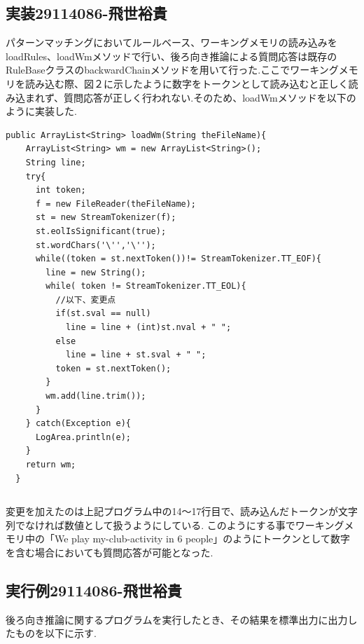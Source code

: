 \documentclass{jarticle}
\begin{document}
\subsection{実装29114086-飛世裕貴}
パターンマッチングにおいてルールベース、ワーキングメモリの読み込みをloadRules、loadWmメソッドで行い、後ろ向き推論による質問応答は既存のRuleBaseクラスのbackwardChainメソッドを用いて行った.ここでワーキングメモリを読み込む際、図２に示したように数字をトークンとして読み込むと正しく読み込まれず、質問応答が正しく行われない.そのため、loadWmメソッドを以下のように実装した.\\

\begin{lstlisting}[caption=loadWmメソッド]
  public ArrayList<String> loadWm(String theFileName){
    ArrayList<String> wm = new ArrayList<String>();
    String line;
    try{
      int token;
      f = new FileReader(theFileName);
      st = new StreamTokenizer(f);
      st.eolIsSignificant(true);
      st.wordChars('\'','\'');
      while((token = st.nextToken())!= StreamTokenizer.TT_EOF){
        line = new String();
        while( token != StreamTokenizer.TT_EOL){
          //以下、変更点
          if(st.sval == null)
            line = line + (int)st.nval + " ";
          else
            line = line + st.sval + " ";
          token = st.nextToken();
        }
        wm.add(line.trim());
      }
    } catch(Exception e){
      LogArea.println(e);
    }
    return wm;
  }

\end{lstlisting}

\begin{verbatim}

\end{verbatim}
変更を加えたのは上記プログラム中の14〜17行目で、読み込んだトークンが文字列でなければ数値として扱うようにしている.
このようにする事でワーキングメモリ中の「We play my-club-activity in 6 people」のようにトークンとして数字を含む場合においても質問応答が可能となった.

\subsection{実行例29114086-飛世裕貴}
後ろ向き推論に関するプログラムを実行したとき、その結果を標準出力に出力したものを以下に示す.\\
\end{document}
